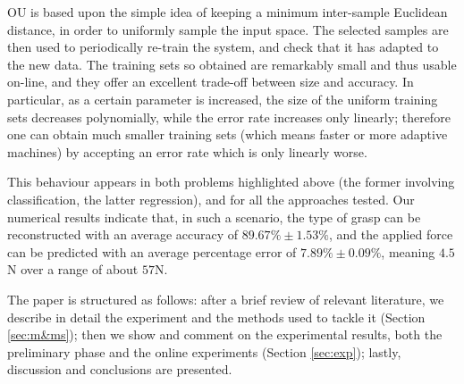 OU is based upon the simple idea of keeping a minimum inter-sample
Euclidean distance, in order to uniformly sample the input space. The
selected samples are then used to periodically re-train the system,
and check that it has adapted to the new data. The training sets so
obtained are remarkably small and thus usable on-line, and they offer
an excellent trade-off between size and accuracy. In particular, as a
certain parameter is increased, the size of the uniform training sets
decreases polynomially, while the error rate increases only
linearly; therefore one can obtain much smaller training sets (which
means faster or more adaptive machines) by accepting an error rate
which is only linearly worse.

This behaviour appears in both problems highlighted above (the former
involving classification, the latter regression), and for all the
approaches tested. Our numerical results indicate that, in such a
scenario, the type of grasp can be reconstructed with an average
accuracy of $89.67\% \pm 1.53\%$, and the applied force can be
predicted with an average percentage error of $7.89\% \pm 0.09\%$,
meaning $4.5$N over a range of about $57$N.

The paper is structured as follows: after a brief review of relevant
literature, we describe in detail the experiment and the methods used
to tackle it (Section \ref{sec:m&ms}); then we show and comment on the
experimental results, both the preliminary phase and the online
experiments (Section \ref{sec:exp}); lastly, discussion and
conclusions are presented.
